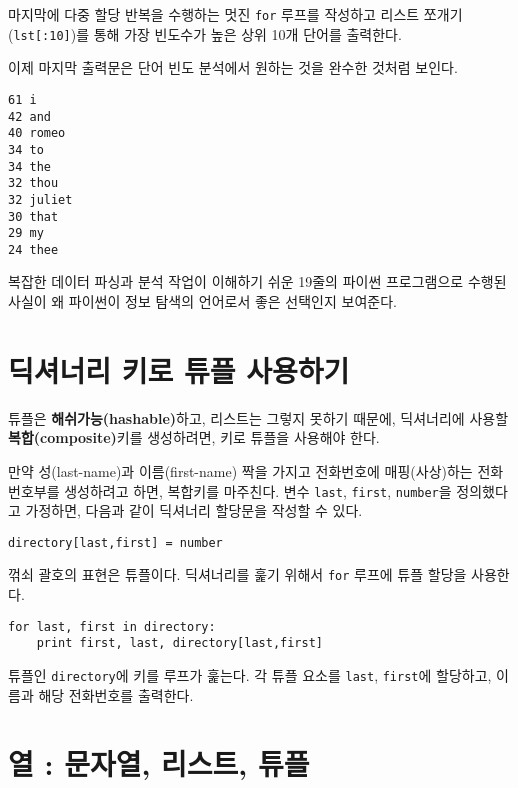 마지막에 다중 할당 반복을 수행하는 멋진 {\tt for} 루프를 작성하고 리스트 쪼개기({\tt lst[:10]})를 통해 가장 빈도수가 높은 상위 10개 단어를 출력한다.

이제 마지막 출력문은 단어 빈도 분석에서 원하는 것을 완수한 것처럼 보인다.

\beforeverb
\begin{verbatim}
61 i
42 and
40 romeo
34 to
34 the
32 thou
32 juliet
30 that
29 my
24 thee
\end{verbatim}
\afterverb
%

복잡한 데이터 파싱과 분석 작업이 이해하기 쉬운 19줄의 파이썬 프로그램으로 수행된 사실이 왜 파이썬이 정보 탐색의 언어로서 
좋은 선택인지 보여준다.

\section{ 딕셔너리 키로 튜플 사용하기}


튜플은 {\bf 해쉬가능(hashable)}하고, 리스트는 그렇지 못하기 때문에, 딕셔너리에 사용할 {\bf 복합(composite)}키를 생성하려면, 
키로 튜플을 사용해야 한다.

만약 성(last-name)과 이름(first-name) 짝을 가지고 전화번호에 매핑(사상)하는 전화번호부를 생성하려고 하면, 복합키를 마주친다.
변수 {\tt last}, {\tt first}, {\tt number}을 정의했다고 가정하면, 다음과 같이 딕셔너리 할당문을 작성할 수 있다.

\beforeverb
\begin{verbatim}
directory[last,first] = number
\end{verbatim}
\afterverb
%

꺾쇠 괄호의 표현은 튜플이다. 딕셔너리를 훑기 위해서 {\tt for} 루프에 튜플 할당을 사용한다.


\beforeverb
\begin{verbatim}
for last, first in directory:
    print first, last, directory[last,first]
\end{verbatim}
\afterverb
%

튜플인 {\tt directory}에 키를 루프가 훑는다. 각 튜플 요소를 {\tt last}, {\tt first}에 할당하고, 이름과 해당 전화번호를 출력한다.

\section{열 : 문자열, 리스트, 튜플}

